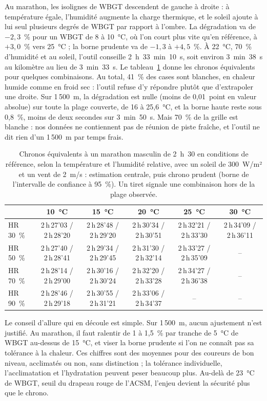 \documentclass[11pt,a4paper]{article}
\begin{document}
Au marathon, les isolignes de WBGT descendent de gauche à droite : à température égale, l'humidité augmente la charge
thermique, et le soleil ajoute à lui seul plusieurs degrés de WBGT par rapport à l'ombre. La dégradation va de
$-2{,}3$~\% pour un WBGT de 8 à 10~°C, où l'on court plus vite qu'en référence, à $+3{,}0$~\% vers 25~°C ; la borne
prudente va de $-1{,}3$ à $+4{,}5$~\%. À 22~°C, 70~\% d'humidité et au soleil, l'outil conseille 2~h~33~min~10~s, soit
environ 3~min~38~s au kilomètre au lieu de 3~min~33~s. Le tableau~\ref{tab:abaque} donne les chronos équivalents pour
quelques combinaisons. Au total, 41~\% des cases sont blanches, en chaleur humide comme en froid sec : l'outil refuse
d'y répondre plutôt que d'extrapoler une droite. Sur 1\,500~m, la dégradation est nulle (moins de 0,01~point en valeur
absolue) sur toute la plage couverte, de 16 à 25,6~°C, et la borne haute reste sous 0,8~\%, moins de deux secondes sur
3~min~50~s. Mais 70~\% de la grille est blanche : nos données ne contiennent pas de réunion de piste fraîche, et l'outil
ne dit rien d'un 1\,500~m par temps frais.

\begin{table}[htbp]
\centering
\small
\caption{Chronos équivalents à un marathon masculin de 2~h~30 en conditions de référence, selon la température et
l'humidité relative, avec un soleil de 300~W/m² et un vent de 2~m/s : estimation centrale, puis chrono prudent (borne
de l'intervalle de confiance à 95~\%). Un tiret signale une combinaison hors de la plage observée.}
\label{tab:abaque}
\begin{tabular}{@{}lccccc@{}}
\toprule
& 10~°C & 15~°C & 20~°C & 25~°C & 30~°C \\
\midrule
HR 30~\% & 2\,h\,27'03 / 2\,h\,28'20 & 2\,h\,28'48 / 2\,h\,29'20 & 2\,h\,30'34 / 2\,h\,30'51 & 2\,h\,32'21 / 2\,h\,33'30 & 2\,h\,34'09 / 2\,h\,36'11 \\
HR 50~\% & 2\,h\,27'40 / 2\,h\,28'41 & 2\,h\,29'34 / 2\,h\,29'45 & 2\,h\,31'30 / 2\,h\,32'14 & 2\,h\,33'27 / 2\,h\,35'09 & -- \\
HR 70~\% & 2\,h\,28'14 / 2\,h\,29'00 & 2\,h\,30'16 / 2\,h\,30'24 & 2\,h\,32'20 / 2\,h\,33'28 & 2\,h\,34'27 / 2\,h\,36'38 & -- \\
HR 90~\% & 2\,h\,28'46 / 2\,h\,29'18 & 2\,h\,30'55 / 2\,h\,31'21 & 2\,h\,33'06 / 2\,h\,34'37 & -- & -- \\
\bottomrule
\end{tabular}
\end{table}

Le conseil d'allure qui en découle est simple. Sur 1\,500~m, aucun ajustement n'est justifié. Au marathon, il faut
ralentir de 1 à 1,5~\% par tranche de 5~°C de WBGT au-dessus de 15~°C, et viser la borne prudente si l'on ne connaît
pas sa tolérance à la chaleur. Ces chiffres sont des moyennes pour des coureurs de bon niveau, acclimatés ou non, sans
distinction ; la tolérance individuelle, l'acclimatation et l'hydratation peuvent peser beaucoup plus. Au-delà de
23~°C de WBGT, seuil du drapeau rouge de l'ACSM, l'enjeu devient la sécurité plus que le chrono.
\end{document}

